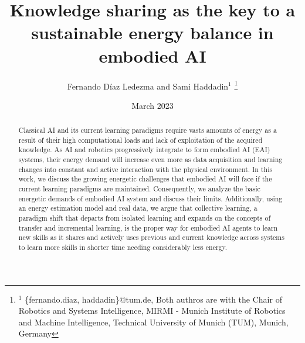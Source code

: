 \documentclass[a4, 10 pt, journal]{IEEEtran}
\begin{document}
\pagestyle{empty}
\title{Knowledge sharing as the key to a sustainable energy balance in embodied AI}

\author{Fernando D\'iaz Ledezma and Sami Haddadin$^{1}$%
\thanks{$^{1}$ {\small \{fernando.diaz, haddadin\}@tum.de}, 
Both authros are with the Chair of Robotics and Systems Intelligence, MIRMI - Munich Institute of Robotics and Machine Intelligence, Technical University of Munich (TUM), Munich, Germany}}
\date{March 2023}

\twocolumn[
  \begin{@twocolumnfalse}
    \maketitle
  \end{@twocolumnfalse}
]

 \begin{abstract}
Classical AI and its current learning paradigms require vasts amounts of energy as a result of their high computational loads and lack of exploitation of the acquired knowledge. As AI and robotics progressively integrate to form embodied AI (EAI) systems, their energy demand will increase even more as data acquisition and learning changes into constant and active interaction with the physical environment. In this work, we discuss the growing energetic challenges that embodied AI will face if the current learning paradigms are maintained. Consequently, we analyze the basic energetic demands of embodied AI system and discuss their limits. Additionally, using an energy estimation model and real data, we argue that collective learning, a paradigm shift that departs from isolated learning and expands on the concepts of transfer and incremental learning, is the proper way for embodied AI agents to learn new skills as it shares and actively uses previous and current knowledge across systems to learn more skills in shorter time needing considerably less energy.
 \end{abstract}
\end{document}

